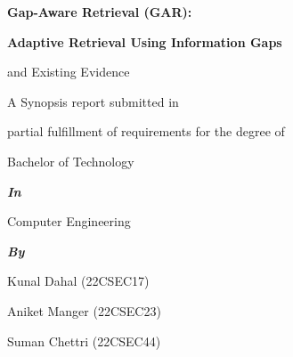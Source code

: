 \documentclass[12pt,a4paper]{report}
\begin{document}

\begin{titlepage}

\thispagestyle{empty}

\begin{center}

\vspace*{0.58in}

{\fontsize{16}{19}\selectfont\bfseries
Gap-Aware Retrieval (GAR):\par}

\vspace{0.08in}

{\fontsize{16}{19}\selectfont\bfseries
Adaptive Retrieval Using Information Gaps\par
and Existing Evidence\par}

\vspace{0.42in}

{\fontsize{12}{18}\selectfont
A Synopsis report submitted in\par}

\vspace{0.12in}

{\fontsize{12}{18}\selectfont
partial fulfillment of requirements for the degree of\par}

\vspace{0.12in}

{\fontsize{12}{18}\selectfont
Bachelor of Technology\par}

\vspace{0.10in}

{\fontsize{12}{18}\selectfont\bfseries\itshape
In\par}

\vspace{0.08in}

{\fontsize{12}{18}\selectfont
Computer Engineering\par}

\vspace{0.10in}

{\fontsize{12}{18}\selectfont\bfseries\itshape
By\par}

\vspace{0.08in}

{\fontsize{12}{18}\selectfont
Kunal Dahal (22CSEC17)\par
Aniket Manger (22CSEC23)\par
Suman Chettri (22CSEC44)\par}


\end{center}
\end{titlepage}
\end{document}
